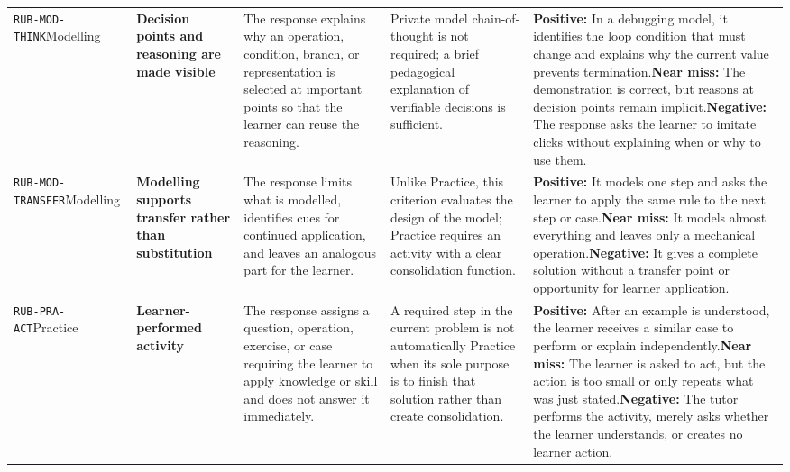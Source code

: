 \documentclass[conference]{IEEEtran}
\begin{document}
\begin{longtable}{P{0.14\textwidth}P{0.17\textwidth}P{0.20\textwidth}P{0.17\textwidth}P{0.24\textwidth}}
\texttt{RUB-MOD-THINK}\newline{}Modelling & \textbf{Decision points and reasoning are made visible} & The response explains why an operation, condition, branch, or representation is selected at important points so that the learner can reuse the reasoning. & Private model chain-of-thought is not required; a brief pedagogical explanation of verifiable decisions is sufficient. & \textbf{Positive:} In a debugging model, it identifies the loop condition that must change and explains why the current value prevents termination.\newline\textbf{Near miss:} The demonstration is correct, but reasons at decision points remain implicit.\newline\textbf{Negative:} The response asks the learner to imitate clicks without explaining when or why to use them. \\
\texttt{RUB-MOD-TRANSFER}\newline{}Modelling & \textbf{Modelling supports transfer rather than substitution} & The response limits what is modelled, identifies cues for continued application, and leaves an analogous part for the learner. & Unlike Practice, this criterion evaluates the design of the model; Practice requires an activity with a clear consolidation function. & \textbf{Positive:} It models one step and asks the learner to apply the same rule to the next step or case.\newline\textbf{Near miss:} It models almost everything and leaves only a mechanical operation.\newline\textbf{Negative:} It gives a complete solution without a transfer point or opportunity for learner application. \\
\texttt{RUB-PRA-ACT}\newline{}Practice & \textbf{Learner-performed activity} & The response assigns a question, operation, exercise, or case requiring the learner to apply knowledge or skill and does not answer it immediately. & A required step in the current problem is not automatically Practice when its sole purpose is to finish that solution rather than create consolidation. & \textbf{Positive:} After an example is understood, the learner receives a similar case to perform or explain independently.\newline\textbf{Near miss:} The learner is asked to act, but the action is too small or only repeats what was just stated.\newline\textbf{Negative:} The tutor performs the activity, merely asks whether the learner understands, or creates no learner action. \\

\end{longtable}
\end{document}
